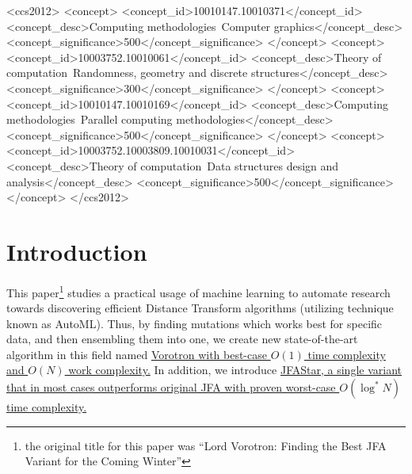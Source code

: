 \documentclass[format=acmsmall,screen,review,authordraft,nonacm]{acmart}
\newcommand{\ourjfasingle}{JFAStar}
\newcommand{\ourjfa}{Vorotron} %
\begin{document}
\begin{CCSXML}
<ccs2012>
<concept>
<concept_id>10010147.10010371</concept_id>
<concept_desc>Computing methodologies~Computer graphics</concept_desc>
<concept_significance>500</concept_significance>
</concept>
<concept>
<concept_id>10003752.10010061</concept_id>
<concept_desc>Theory of computation~Randomness, geometry and discrete structures</concept_desc>
<concept_significance>300</concept_significance>
</concept>
<concept>
<concept_id>10010147.10010169</concept_id>
<concept_desc>Computing methodologies~Parallel computing methodologies</concept_desc>
<concept_significance>500</concept_significance>
</concept>
<concept>
<concept_id>10003752.10003809.10010031</concept_id>
<concept_desc>Theory of computation~Data structures design and analysis</concept_desc>
<concept_significance>500</concept_significance>
</concept>
</ccs2012>
\end{CCSXML}



\maketitle

\section{Introduction} %

This paper\footnote{the original title for this paper was ``Lord Vorotron:
Finding the Best JFA Variant for the Coming Winter''} studies a practical usage of machine learning to automate research
towards discovering efficient Distance Transform algorithms (utilizing technique known as AutoML).
Thus, by finding mutations which works best for specific data, and then ensembling them into
one, we create new state-of-the-art algorithm in this field named \uline{\ourjfa
\hspace{0.01cm} with best-case $O(1)$ time complexity and $O(N)$ work complexity.}
In addition, we introduce \uline{\ourjfasingle, a single
variant that in most cases outperforms original JFA with proven worst-case
$O(\log^{*}N)$ time complexity.}
\end{document}
